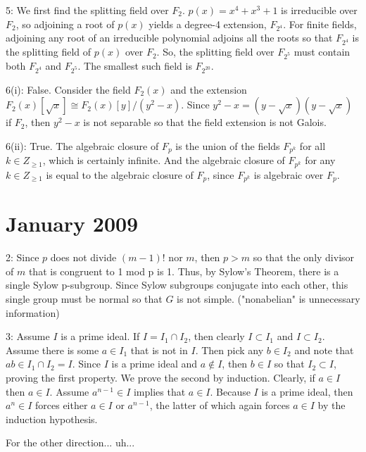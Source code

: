 \documentclass[12pt]{article}
\begin{document}
5: We first find the splitting field over $F_2$. $p(x) = x^4+x^3+1$ is irreducible over $F_2$, so adjoining a root of $p(x)$ yields a degree-4 extension, $F_{2^4}$. For finite fields, adjoining any root of an irreducible polynomial adjoins all the roots so that $F_{2^4}$ is the splitting field of $p(x)$ over $F_2$. So, the splitting field over $F_{2^5}$ must contain both $F_{2^4}$ and $F_{2^5}$. The smallest such field is $F_{2^20}$. \newline

6(i): False. Consider the field $F_2(x)$ and the extension $F_2(x)[\sqrt{x}] \cong F_2(x)[y]/(y^2-x)$. Since $y^2-x=(y-\sqrt{x})(y-\sqrt{x})$ if $F_2$, then $y^2-x$ is not separable so that the field extension is not Galois. \newline

6(ii): True. The algebraic closure of $F_p$ is the union of the fields $F_{p^k}$ for all $k \in Z_{\geq 1}$, which is certainly infinite. And the algebraic closure of $F_{p^k}$ for any $k \in Z_{\geq 1}$ is equal to the algebraic closure of $F_p$, since $F_{p^k}$ is algebraic over $F_p$.

\section{January 2009}
2: Since $p$ does not divide $(m-1)!$ nor $m$, then $p>m$ so that the only divisor of $m$ that is congruent to 1 mod p is 1. Thus, by Sylow's Theorem, there is a single Sylow p-subgroup. Since Sylow subgroups conjugate into each other, this single group must be normal so that $G$ is not simple. ("nonabelian" is unnecessary information) \newline

3: Assume $I$ is a prime ideal. If $I = I_1 \cap I_2$, then clearly $I \subset I_1$ and $I \subset I_2$. Assume there is some $a \in I_1$ that is not in $I$. Then pick any $b \in I_2$ and note that $ab \in I_1 \cap I_2 = I$. Since $I$ is a prime ideal and $a \notin I$, then $b \in I$ so that $I_2 \subset I$, proving the first property. We prove the second by induction. Clearly, if $a \in I$ then $a \in I$. Assume $a^{n-1} \in I$ implies that $a \in I$. Because $I$ is a prime ideal, then $a^n \in I$ forces either $a \in I$ or $a^{n-1}$, the latter of which again forces $a \in I$ by the induction hypothesis. \newline

For the other direction... uh...\newline
\end{document}
